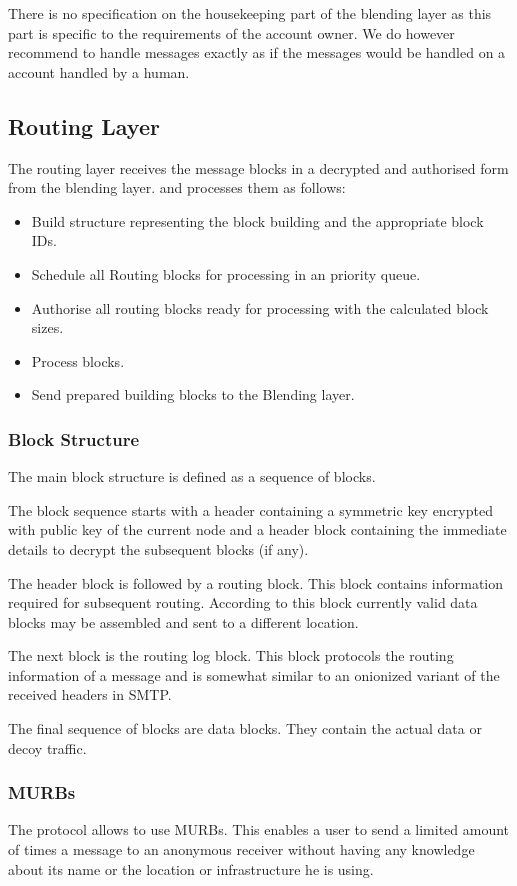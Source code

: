 There is no specification on the housekeeping part of the blending layer as this part is specific to the requirements of the account owner. We do however recommend to handle messages exactly as if the messages would be handled on a account handled by a human. 

\subsection{Routing Layer}
The routing layer receives the message blocks in a decrypted and authorised form from the blending layer. and processes them as follows:

\begin{itemize}
	\item Build structure representing the block building and the appropriate block IDs.
	\item Schedule all Routing blocks for processing in an priority queue.
	\item Authorise all routing blocks ready for processing with the calculated block sizes.
	\item Process blocks.
	\item Send prepared building blocks to the Blending layer.
\end{itemize}

\subsubsection{Block Structure}
The main block structure is defined as a sequence of blocks.

The block sequence starts with a header containing a symmetric key encrypted with public key of the current node and a header block containing the immediate details to decrypt the subsequent blocks (if any).

The header block is followed by a routing block. This block contains information required for subsequent routing. According to this block currently valid data blocks may be assembled and sent to a different location. 

The next block is the routing log block. This block protocols the routing information of a message and is somewhat similar to an onionized variant of the received headers in SMTP.

The final sequence of blocks are data blocks. They contain the actual data or decoy traffic.

\subsubsection{MURBs}
The protocol allows to use MURBs. This enables a user to send a limited amount of times a message to an anonymous receiver without having any knowledge about its name or the location or infrastructure he is using.

